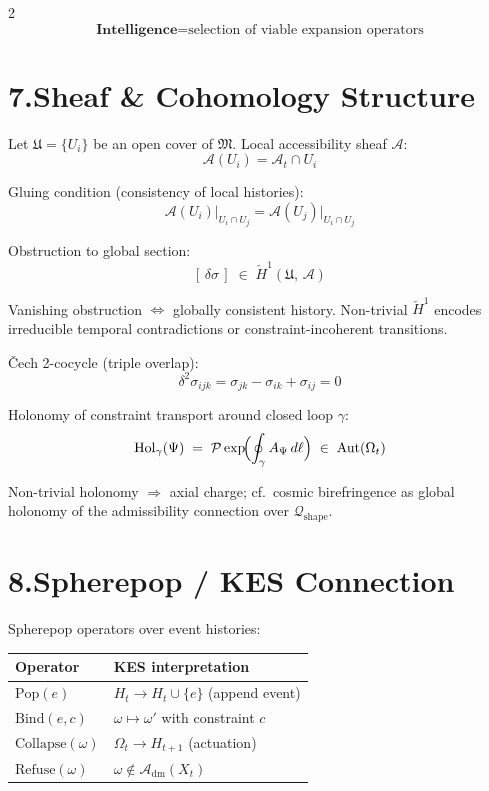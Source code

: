 \documentclass[10pt,a4paper]{article}
\theoremstyle{plain}
\theoremstyle{remark}
\newcommand{\A}{\mathcal{A}}
\newcommand{\fM}{\mathfrak{M}}
\newcommand{\Adm}{\mathcal{A}_{\mathrm{dm}}}
\newcommand{\Hcech}{\check{H}}
\begin{document}
\begin{multicols}{2}
\[
\boxed{
\textbf{Intelligence}
=
\text{selection of viable expansion operators}
}
\]

\section*{7.\enspace Sheaf \& Cohomology Structure}

Let $\mathfrak{U}=\{U_i\}$ be an open cover of $\fM$.
Local accessibility sheaf $\mathscr{A}$:
\[
\mathscr{A}(U_i) = \A_t\cap U_i
\]

Gluing condition (consistency of local histories):
\[
\mathscr{A}(U_i)\big|_{U_i\cap U_j}
=
\mathscr{A}(U_j)\big|_{U_i\cap U_j}
\]

Obstruction to global section:
\[
[\,\delta\sigma\,]
\;\in\;
\Hcech^1(\mathfrak{U},\,\mathscr{A})
\]

Vanishing obstruction $\Leftrightarrow$ globally consistent history.
Non-trivial $\Hcech^1$ encodes irreducible temporal contradictions or
constraint-incoherent transitions.

\v{C}ech 2-cocycle (triple overlap):
\[
\delta^2\sigma_{ijk}
=
\sigma_{jk}
-\sigma_{ik}
+\sigma_{ij}
=0
\]

Holonomy of constraint transport around closed loop $\gamma$:
\[
\mathrm{Hol}_\gamma(\Psi)
\;=\;
\mathcal{P}\exp\!\Bigl(
\oint_\gamma A_\Psi\,d\ell
\Bigr)
\;\in\;
\mathrm{Aut}(\Omega_t)
\]

Non-trivial holonomy $\Rightarrow$ axial charge; cf.\ cosmic birefringence as
global holonomy of the admissibility connection over $\mathcal{Q}_{\mathrm{shape}}$.

\section*{8.\enspace Spherepop / KES Connection}

Spherepop operators over event histories:

\begin{center}
\begin{tabular}{@{}ll@{}}
\toprule
Operator & KES interpretation\\
\midrule
$\mathrm{Pop}(e)$ & $H_t\to H_t\cup\{e\}$ (append event)\\
$\mathrm{Bind}(e,c)$ & $\omega\mapsto\omega'$ with constraint $c$\\
$\mathrm{Collapse}(\omega)$ & $\Omega_t\to H_{t+1}$ (actuation)\\
$\mathrm{Refuse}(\omega)$ & $\omega\notin\Adm(X_t)$\\
\bottomrule
\end{tabular}
\end{center}


\end{multicols}
\end{document}

